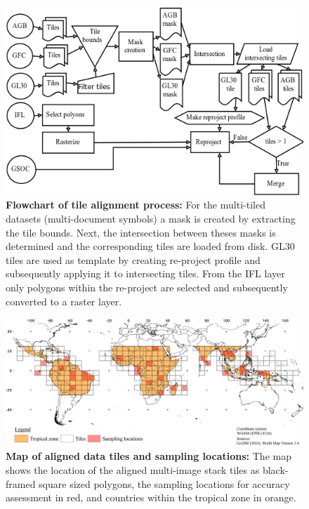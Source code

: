 		\begin{figure}[ht]
			\centering
			\includegraphics[scale=.8]{img/align}
			\caption[Flowchart of tile alignment process]{\textbf{Flowchart of tile alignment process:} For the multi-tiled datasets (multi-document symbols) a mask is created by extracting the tile bounds. Next, the intersection between theses masks is determined and the corresponding tiles are loaded from disk. \ac{GL30} tiles are used as template by creating re-project profile and subsequently applying it to intersecting tiles. From the \ac{IFL} layer only polygons within the re-project are selected and subsequently converted to a raster layer.}
			\label{fig:preprocessing_flowchart}
		\end{figure}
		\begin{figure}[ht]
			\centering
			\includegraphics[scale=.91]{img/method_overview_frameless}
			\caption[Map of aligned data tiles and sampling locations]{\textbf{Map of aligned data tiles and sampling locations:} The map shows the location of the aligned multi-image stack tiles as black-framed square sized polygons, the sampling locations for accuracy assessment in red, and countries within the tropical zone in orange.}
			\label{fig:aism}
		\end{figure}

